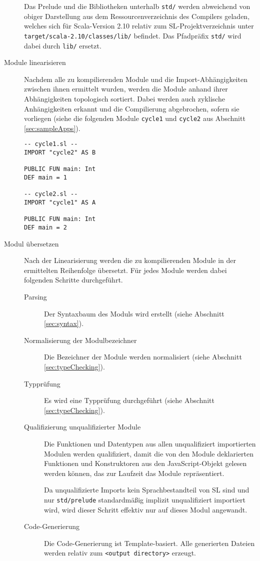 \documentclass[runningheads]{llncs}
\begin{document}
\begin{description}
    Das Prelude und die Bibliotheken unterhalb \texttt{std/} werden
    abweichend von obiger Darstellung aus dem Ressourcenverzeichnis
    des Compilers geladen, welches sich für Scala-Version 2.10
    relativ zum SL-Projektverzeichnis unter \texttt{target/scala-2.10/classes/lib/}
    befindet. Das Pfadpräfix \texttt{std/} wird dabei durch
    \texttt{lib/} ersetzt.
\item[Module linearisieren] Nachdem alle zu kompilierenden Module und
    die Import-Abhängigkeiten zwischen ihnen ermittelt wurden, werden
    die Module anhand ihrer Abhängigkeiten topologisch sortiert. Dabei
    werden auch zyklische Anhängigkeiten erkannt und die Compilierung
    abgebrochen, sofern sie vorliegen (siehe die folgenden Module
    \texttt{cycle1} und \texttt{cycle2} aus Abschnitt \ref{sec:sampleApps}).
    
\begin{verbatim}
-- cycle1.sl --
IMPORT "cycle2" AS B

PUBLIC FUN main: Int
DEF main = 1

-- cycle2.sl --
IMPORT "cycle1" AS A

PUBLIC FUN main: Int
DEF main = 2
\end{verbatim}
    
\item[Modul übersetzen] Nach der Linearisierung werden die zu
    kompilierenden Module in der ermittelten Reihenfolge übersetzt. Für
    jedes Module werden dabei folgenden Schritte durchgeführt.
    \begin{description}
    \item[Parsing] Der Syntaxbaum des Moduls wird erstellt (siehe
        Abschnitt \ref{sec:syntax}).
    \item[Normalisierung der Modulbezeichner] Die Bezeichner der Module
        werden normalisiert (siehe Abschnitt \ref{sec:typeChecking}).
    \item[Typprüfung] Es wird eine Typprüfung durchgeführt (siehe
        Abschnitt \ref{sec:typeChecking}).
    \item[Qualifizierung unqualifizierter Module] Die Funktionen und
        Datentypen aus allen unqualifiziert importierten Modulen werden
        qualifiziert, damit die von den Module deklarierten Funktionen
        und Konstruktoren aus den JavaScript-Objekt gelesen werden können,
        das zur Laufzeit das Module repräsentiert.

        Da unqualifizierte Imports kein Sprachbestandteil von SL sind
        und nur \texttt{std/prelude} standardmäßig implizit
        unqualifiziert importiert wird, wird dieser Schritt effektiv
        nur auf dieses Modul angewandt.
    \item[Code-Generierung] Die Code-Generierung ist Template-basiert.
        Alle generierten Dateien werden relativ zum \texttt{<output
        directory>} erzeugt.
        

\end{description}
\end{description}
\end{document}
